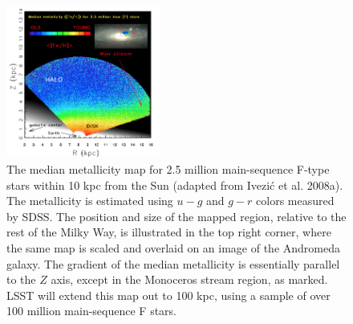 \documentclass{emulateapj}
\begin{document}
\begin{figure}
\includegraphics[width=0.45\textwidth,clip]{panelsLSST.png}
\caption{
The median metallicity map for 2.5 million main-sequence F-type stars within 10 kpc 
from the Sun (adapted from Ivezi\'{c} et al. 2008a). The metallicity is estimated using 
$u-g$ and $g-r$ colors measured by SDSS. The position and size of the mapped 
region, relative to the rest of the Milky Way, is illustrated in the top right 
corner, where the same map is scaled and overlaid on an image of the Andromeda 
galaxy. The gradient of the median metallicity is essentially parallel
to the $Z$ axis, except in the Monoceros stream region, as marked. LSST 
will extend this map out to 100 kpc, using a sample of over 100 million 
main-sequence F stars.} 
\label{Fig:FeH3}
\end{figure}
\end{document}
